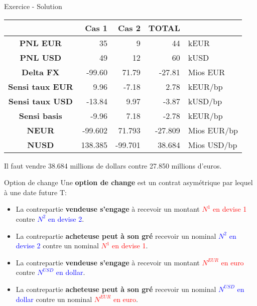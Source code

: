 \documentclass{beamer}
\begin{document}
\begin{frame}{Exercice - Solution}
\begin{center}
\begin{tabular}{|c|r|r|r|l|}
\hline
&\textbf{Cas 1}&\textbf{Cas 2}&\textbf{TOTAL}& \\
\hline
\hline
\textbf{PNL EUR} &35&9&44&kEUR\\
\textbf{PNL USD} &49&12&60&kUSD\\
\hline
\hline
\textbf{Delta FX} &-99.60&71.79&-27.81&Mios EUR\\
\textbf{Sensi taux EUR} &9.96&-7.18&2.78&kEUR/bp\\
\textbf{Sensi taux USD} &-13.84&9.97&-3.87&kUSD/bp\\
\textbf{Sensi basis} &-9.96&7.18&-2.78&kEUR/bp\\
\hline
\hline
\textbf{NEUR} &-99.602&71.793&-27.809&Mios EUR/bp\\
\textbf{NUSD} &138.385&-99.701&38.684&Mios USD/bp\\
\hline
\end{tabular}
\end{center}
Il faut vendre 38.684 millions de dollars contre 27.850 millions d'euros.
\end{frame}

\begin{frame}{Option de change}
Une \textbf{option de change} est un contrat asymétrique par lequel à une date future T:\\
\vspace{0.5cm}
\begin{overprint}
\begin{itemize}
\item La contrepartie \textbf{vendeuse s'engage} à recevoir un montant \textcolor{red}{$N^1$ en devise 1} contre \textcolor{blue}{$N^2$ en devise 2}.
\item La contrepartie \textbf{acheteuse peut à son gré} recevoir un nominal \textcolor{blue}{$N^2$ en devise 2} contre un nominal \textcolor{red}{$N^1$ en devise 1}.
\end{itemize}
\begin{itemize}
\item La contrepartie \textbf{vendeuse s'engage} à recevoir un montant \textcolor{red}{$N^{EUR}$ en euro} contre \textcolor{blue}{$N^{USD}$ en dollar}.
\item La contrepartie \textbf{acheteuse peut à son gré} recevoir un nominal \textcolor{blue}{$N^{USD}$ en dollar} contre un nominal \textcolor{red}{$N^{EUR}$ en euro}.
\end{itemize}
\end{overprint}
\end{frame}
\end{document}
